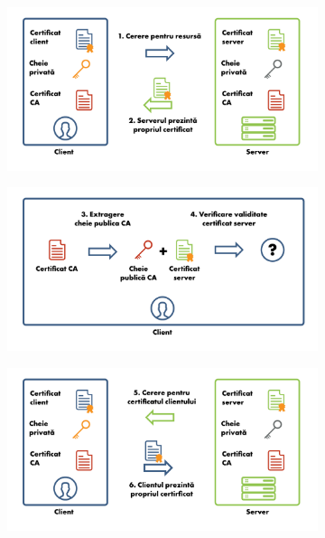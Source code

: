 \begin{figure}[htbp]
  \centering
  \begin{subfigure}[b]{0.48\textwidth}
    \centering
    \def\svgwidth{\columnwidth}
    \includegraphics{chapters/12-auth/img/certificate-1-2.svg.pdf}
  \end{subfigure}
  \begin{subfigure}[b]{0.48\textwidth}
    \centering
    \def\svgwidth{\columnwidth}
    \includegraphics{chapters/12-auth/img/certificate-3-4.svg.pdf}
  \end{subfigure}
  \begin{subfigure}[b]{0.48\textwidth}
    \centering
    \def\svgwidth{\columnwidth}
    \includegraphics{chapters/12-auth/img/certificate-5-6.svg.pdf}

\end{subfigure}
\end{figure}
